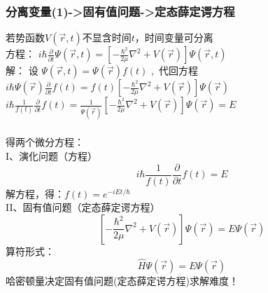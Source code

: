 \begin{frame}
\frametitle{分离变量(1)->固有值问题->定态薛定谔方程}
	若势函数$V(\vec{r},t ) $不显含时间$t$，时间变量可分离 \\ \vspace{0.3cm}
	方程： { $ \displaystyle i \hbar \frac{\partial }{\partial t} \Psi (\vec{r},t ) =\left [- \frac{\hbar^2}{2\mu }\nabla ^2 + V(\vec{r}) \right ]\Psi (\vec{r},t ) $}  \\  \vspace{0.3cm}
	\alert{解：}  设  $\Psi (\vec{r},t )  = \Psi (\vec{r} ) f(t) $ , 代回方程 \\ \vspace{0.6em}
	{ $ \displaystyle i\hbar \Psi (\vec{r})  \frac{\partial }{\partial t} f(t)=f(t) \left [ -\frac{\hbar^2}{2\mu }\nabla ^2 + V(\vec{r}) \right ]\Psi (\vec{r}) $}  \\ 	
	{ $ \displaystyle i\hbar \frac{1}{f(t)}  \frac{\partial }{\partial t} f(t)= \frac{1}{\Psi (\vec{r}) } \left [ -\frac{\hbar^2}{2\mu }\nabla ^2 + V(\vec{r}) \right ]\Psi (\vec{r}) =E $}  \\ 	
\end{frame}

\begin{frame}
	\frametitle{}
	得两个微分方程：\\  \vspace{0.3cm}
	I、演化问题（方程）  \[ \displaystyle  i\hbar \frac{1}{f(t)}  \frac{\partial }{\partial t} f(t)=E \]   
	解方程，得：$\displaystyle  f(t) =e^{-iEt/\hbar}$ \\  \vspace{0.6cm}
	II、固有值问题（定态薛定谔方程） \[\displaystyle   \left [ -\frac{\hbar^2}{2\mu }\nabla ^2 + V(\vec{r}) \right ]\Psi (\vec{r}) =E \Psi (\vec{r})  \]   
	算符形式：\[   \hat{H} \Psi (\vec{r}) =E \Psi (\vec{r})    \] 
	哈密顿量决定固有值问题(定态薛定谔方程)求解难度！	
\end{frame}

